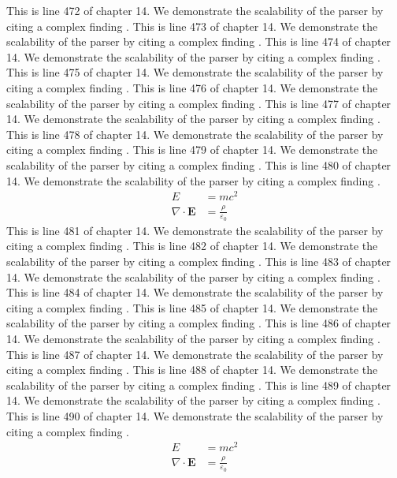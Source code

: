 This is line 472 of chapter 14. We demonstrate the scalability of the parser by citing a complex finding \cite{ref14_472}.
This is line 473 of chapter 14. We demonstrate the scalability of the parser by citing a complex finding \cite{ref14_473}.
This is line 474 of chapter 14. We demonstrate the scalability of the parser by citing a complex finding \cite{ref14_474}.
This is line 475 of chapter 14. We demonstrate the scalability of the parser by citing a complex finding \cite{ref14_475}.
This is line 476 of chapter 14. We demonstrate the scalability of the parser by citing a complex finding \cite{ref14_476}.
This is line 477 of chapter 14. We demonstrate the scalability of the parser by citing a complex finding \cite{ref14_477}.
This is line 478 of chapter 14. We demonstrate the scalability of the parser by citing a complex finding \cite{ref14_478}.
This is line 479 of chapter 14. We demonstrate the scalability of the parser by citing a complex finding \cite{ref14_479}.
This is line 480 of chapter 14. We demonstrate the scalability of the parser by citing a complex finding \cite{ref14_480}.
\begin{align*}
  E &= mc^2 \\
  \nabla \cdot \mathbf{E} &= \frac{\rho}{\varepsilon_0}
\end{align*}
This is line 481 of chapter 14. We demonstrate the scalability of the parser by citing a complex finding \cite{ref14_481}.
This is line 482 of chapter 14. We demonstrate the scalability of the parser by citing a complex finding \cite{ref14_482}.
This is line 483 of chapter 14. We demonstrate the scalability of the parser by citing a complex finding \cite{ref14_483}.
This is line 484 of chapter 14. We demonstrate the scalability of the parser by citing a complex finding \cite{ref14_484}.
This is line 485 of chapter 14. We demonstrate the scalability of the parser by citing a complex finding \cite{ref14_485}.
This is line 486 of chapter 14. We demonstrate the scalability of the parser by citing a complex finding \cite{ref14_486}.
This is line 487 of chapter 14. We demonstrate the scalability of the parser by citing a complex finding \cite{ref14_487}.
This is line 488 of chapter 14. We demonstrate the scalability of the parser by citing a complex finding \cite{ref14_488}.
This is line 489 of chapter 14. We demonstrate the scalability of the parser by citing a complex finding \cite{ref14_489}.
This is line 490 of chapter 14. We demonstrate the scalability of the parser by citing a complex finding \cite{ref14_490}.
\begin{align*}
  E &= mc^2 \\
  \nabla \cdot \mathbf{E} &= \frac{\rho}{\varepsilon_0}
\end{align*}
